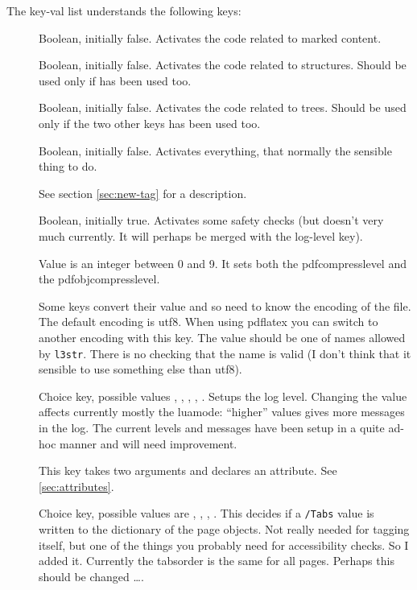 \documentclass[DIV=12,parskip=half-,bibliography=totoc]{scrartcl}
\begin{document}
The key-val list understands the following keys:
\begin{description}
\item[ ] Boolean, initially false. Activates the code related to marked content.
\item[] Boolean, initially false. Activates the code related to structures. Should be used only if  has been used too.
\item[] Boolean, initially false. Activates the code related to trees. Should be used only if the two other keys has been used too.
\item[] Boolean, initially false. Activates everything, that normally the sensible thing to do.
\item[] See section \ref{sec:new-tag} for a description.    
\item[] Boolean, initially true. Activates some safety checks (but doesn't very much currently. It will perhaps be merged with the log-level key).
\item[] Value is an integer between 0 and 9. It sets both the pdfcompresslevel and the pdfobjcompresslevel.
\item[]  Some keys convert their value and so need to know the encoding of the file. The default encoding is utf8.  When using pdflatex you can switch to another encoding with this key. The value should be one of names allowed by \texttt{l3str}. There is no checking that the name is valid (I don't think that it sensible to use something else than utf8).
\item[] Choice key, possible values , , , ,  .  Setups the log level.  Changing the value affects currently mostly the luamode: \enquote{higher} values gives more messages in the log. The current levels and messages have been setup in a quite ad-hoc manner and will need improvement.
\item[] This key takes two arguments and declares an attribute. See \ref{sec:attributes}. 
\item[] Choice key, possible values are , , , .  This decides if a \verb+/Tabs+ value is written to the dictionary of the page objects. Not really needed for tagging itself, but one of the things you probably need for accessibility checks. So I added it. Currently the tabsorder is the same for all pages. Perhaps this should be changed \ldots.

\end{description}
\end{document}

